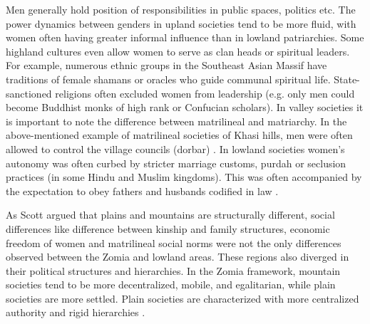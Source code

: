  Men generally hold position of responsibilities in public spaces, politics etc. The power dynamics between genders in upland societies tend to be more fluid, with women often having greater informal influence than in lowland patriarchies. Some highland cultures even allow women to serve as clan heads or spiritual leaders.  For example, numerous ethnic groups in the Southeast Asian Massif have traditions of female shamans or oracles who guide communal spiritual life. State\hyp{}sanctioned religions often excluded women from leadership (e.g. only men could become Buddhist monks of high rank or Confucian scholars). In valley societies it is important to note the difference between matrilineal and matriarchy. In the above\hyp{}mentioned example of matrilineal societies of Khasi hills, men were often allowed to control the  village councils (dorbar) \citep{WashingtonPost_2015,TheGuardian2011}. In lowland societies women’s autonomy was often curbed by stricter marriage customs, purdah or seclusion practices (in some Hindu and Muslim kingdoms). This was often accompanied by the expectation to obey fathers and husbands codified in law \citep{Papanek_1973,Devi2019}.


As Scott argued that plains and mountains are structurally different, social differences like difference between kinship and family structures, economic freedom of women and matrilineal social norms were not the only differences observed between the Zomia and lowland areas. These regions also diverged in their political structures and hierarchies. In the Zomia framework, mountain societies tend to be more decentralized, mobile, and egalitarian, while plain societies are more settled. Plain societies are characterized with more centralized authority and rigid hierarchies \citep{Hammond_2011}.


